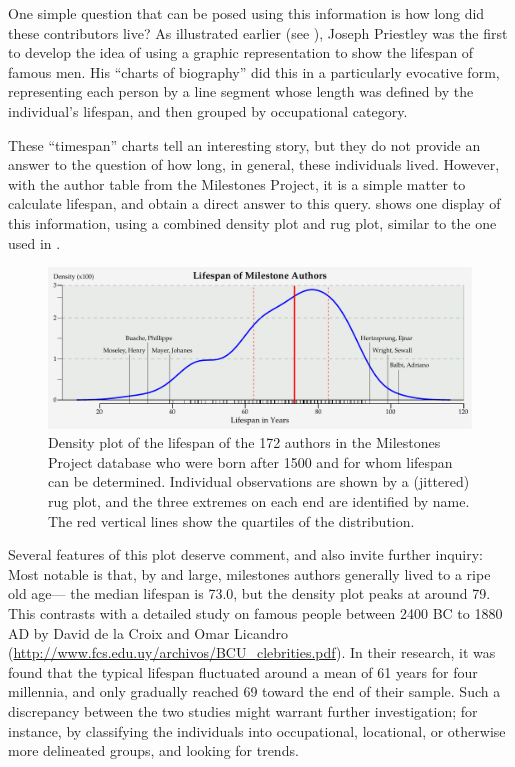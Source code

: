One simple question that can be posed using this information is how long did these contributors live? As illustrated earlier (see ), Joseph Priestley was the first to develop the idea of using a graphic representation to show the lifespan of famous men. His ``charts of biography'' did this in a particularly evocative form, representing each person by a line segment whose length was defined by the individual's lifespan, and then grouped by occupational category.

These ``timespan'' charts tell an interesting story, but they do not provide an answer to the question of how long, in general, these individuals lived.  However, with the author table from the Milestones Project, it is a simple matter to calculate lifespan, and obtain a direct answer to this query.  shows one display of this information, using a combined density plot and rug plot, similar to the one used in .

\begin{figure}[!htb]
  \centering
  \includegraphics[width=\textwidth,clip]{fig/lifespan3}
  \caption{Density plot of the lifespan of the 172 authors in the Milestones Project database who were born after 1500 and for whom lifespan can be determined. Individual observations are shown by a (jittered) rug plot, and the three extremes on each end are identified by name.  The red vertical lines show the quartiles of the distribution.}
  \label{fig:lifespan}
\end{figure}

Several features of this plot deserve comment, and also invite further inquiry: Most notable is that, by and large, milestones authors generally lived to a ripe old age--- the median lifespan is 73.0, but the density plot peaks at around 79. This contrasts with a detailed study on famous people between 2400 BC to 1880 AD by David de la Croix and Omar Licandro (\url{http://www.fcs.edu.uy/archivos/BCU_clebrities.pdf}).  In their research, it was found that the typical lifespan fluctuated around a mean of 61 years for four millennia, and only gradually reached 69 toward the end of their sample. Such a discrepancy between the two studies might warrant further investigation; for instance, by classifying the individuals into occupational, locational, or otherwise more delineated groups, and looking for trends.

